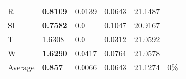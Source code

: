 \documentclass[11pt, a4paper]{article}
\begin{document}
\begin{table}[H]
\begin{tabular}{llllll}
R                                & \textbf{0.8109}                   & 0.0139                            & 0.0643                               & 21.1487                                     &                                   \\
SI                        & \textbf{0.7582}                   & 0.0                               & 0.1047                               & 20.9167                                     &                                   \\
T                              & 1.6308                            & 0.0                               & 0.0312                               & 21.0592                                     &                                   \\
W                             & \textbf{1.6290}                   & 0.0417                            & 0.0764                               & 21.0578                                     &                                   \\ \hline
Average                               & \textbf{0.857}                    & 0.0066                            & 0.0643                               & 21.1274                                     & 0\%
\end{tabular}
\end{table}
\end{document}
